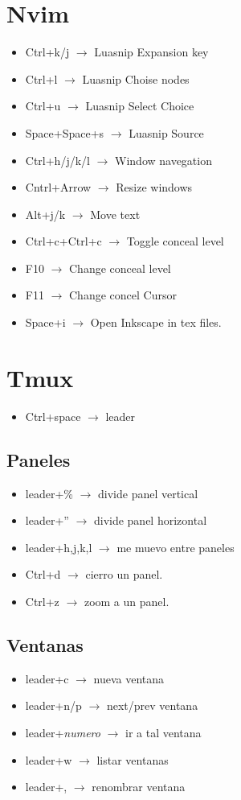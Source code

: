 \documentclass[a4paper,10pt]{article}
\begin{document}
\section{Nvim}
\begin{itemize}
  \item Ctrl+k/j $\to$ Luasnip Expansion key
  \item Ctrl+l  $\to$ Luasnip Choise nodes
  \item Ctrl+u $\to$ Luasnip Select Choice
  \item Space+Space+s $\to$ Luasnip Source
  \item Ctrl+h/j/k/l $\to$ Window navegation
  \item Cntrl+Arrow $\to$ Resize windows
  \item Alt+j/k $\to$ Move text
  \item Ctrl+c+Ctrl+c $\to$ Toggle conceal level
  \item F10 $\to$ Change conceal level
  \item F11 $\to$ Change concel Cursor
  \item Space+i $\to$ Open Inkscape in tex files.
\end{itemize}
\section{Tmux}
\begin{itemize}
  \item Ctrl+space $\to$ leader
\end{itemize}
\subsection{Paneles}
\begin{itemize}
  \item leader+\% $\to$ divide panel vertical
  \item leader+'' $\to$ divide panel horizontal
  \item leader+h,j,k,l $\to$ me muevo entre paneles
  \item Ctrl+d $\to$ cierro un panel.
  \item Ctrl+z $\to$ zoom a un panel.
\end{itemize}
\subsection{Ventanas}
\begin{itemize}
  \item leader+c $\to$ nueva ventana
  \item leader+n/p $\to$ next/prev ventana
  \item leader+\textit{numero} $\to$ ir a tal ventana
  \item leader+w $\to$ listar ventanas
  \item leader+, $\to$ renombrar ventana
\end{itemize}
\end{document}
